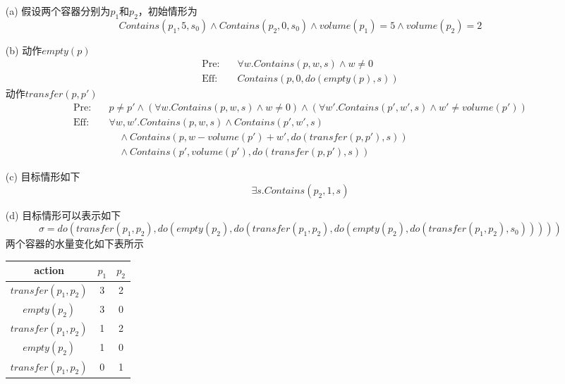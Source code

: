 \documentclass[a4paper, 11pt]{article}
\begin{document}
\begin{answer}
\begin{itemize}
    \item [(a)] 假设两个容器分别为$p_1$和$p_2$，初始情形为
    \[Contains(p_1,5,s_0)\land Contains(p_2,0,s_0)\land volume(p_1)=5\land volume(p_2)=2\]
    \item [(b)] 动作$empty(p)$
    \[\begin{aligned}
        \text{Pre:}\quad & \forall w.Contains(p,w,s)\land w\ne 0\\
        \text{Eff:}\quad & Contains(p,0,do(empty(p),s))
    \end{aligned}\]
    动作$transfer(p,p')$
    \[\begin{aligned}
        \text{Pre:}\quad & p\ne p'\land (\forall w.Contains(p,w,s)\land w\ne 0)\land (\forall w'.Contains(p',w',s)\land w'\ne volume(p'))\\
        \text{Eff:}\quad & \forall w,w'.Contains(p,w,s)\land Contains(p',w',s)\\
        &\quad \land Contains(p,w-volume(p')+w',do(transfer(p,p'),s))\\
        &\quad \land Contains(p',volume(p'),do(transfer(p,p'),s))
    \end{aligned}\]
    \item [(c)] 目标情形如下
    \[\exists s.Contains(p_2,1,s)\]
    \item [(d)] 目标情形可以表示如下
    \[\sigma=do(transfer(p_1,p_2),do(empty(p_2),do(transfer(p_1,p_2),do(empty(p_2),do(transfer(p_1,p_2),s_0)))))\]
    两个容器的水量变化如下表所示
    \begin{center}
    \begin{tabular}{|c|c|c|}\hline
        action & $p_1$ & $p_2$\\\hline
        $transfer(p_1,p_2)$ & 3 & 2 \\\hline
        $empty(p_2)$ & 3 & 0 \\\hline
        $transfer(p_1,p_2)$ & 1 & 2 \\\hline
        $empty(p_2)$ & 1 & 0 \\\hline
        $transfer(p_1,p_2)$ & 0 & 1 \\\hline
    \end{tabular}
    \end{center}
\end{itemize}
\end{answer}
\end{document}
